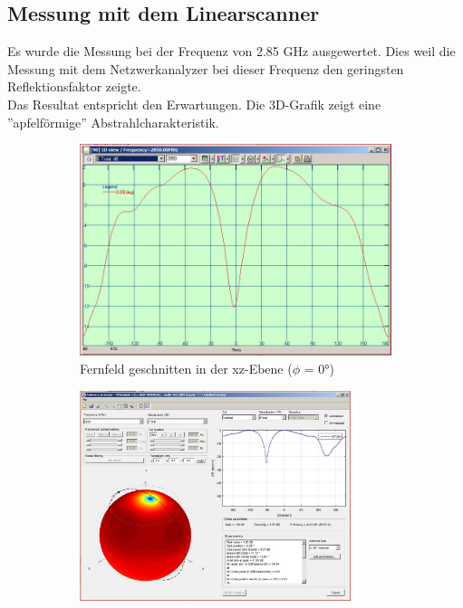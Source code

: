\newpage

\subsection{Messung mit dem Linearscanner}

Es wurde die Messung bei der Frequenz von 2.85 GHz ausgewertet. Dies weil die Messung mit dem Netzwerkanalyzer bei dieser Frequenz den geringsten Reflektionsfaktor zeigte.\\
Das Resultat entspricht den Erwartungen. Die 3D-Grafik zeigt eine ''apfelförmige'' Abstrahlcharakteristik.

\begin{figure}[htbp]
	\begin{center}
		\begin{subfigure}[t]{0.49\textwidth}
			\begin{center}
				\includegraphics[width=\textwidth]{pic/Messungen/Messung_Farfield.JPG}
				\caption{Fernfeld geschnitten in der xz-Ebene ($\phi$ = 0°)}
				\label{fig:Mess_Farfield_dia}
			\end{center}
		\end{subfigure}
		\begin{subfigure}[t]{0.49\textwidth}
			\begin{center}
				\includegraphics[width=0.87\textwidth]{pic/Messungen/Overview_sphare.JPG}

\end{center}
\end{subfigure}
\end{center}
\end{figure}
